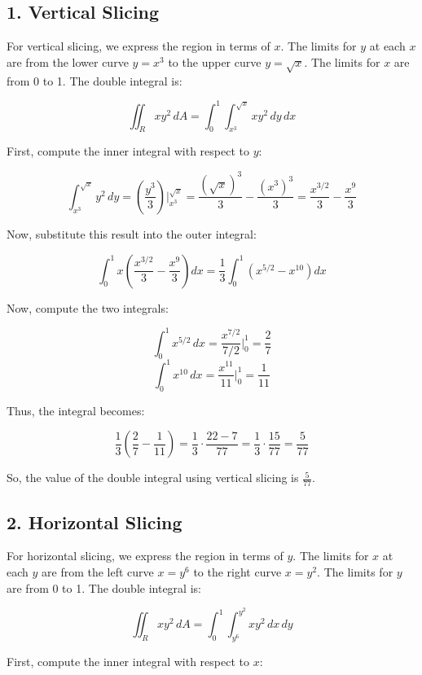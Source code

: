 \documentclass[11pt]{article}
\begin{document}
\newpage

\subsection{1. Vertical Slicing}

For vertical slicing, we express the region in terms of \( x \). The limits for \( y \) at each \( x \) are from the lower curve \( y = x^3 \) to the upper curve \( y = \sqrt{x} \). The limits for \( x \) are from 0 to 1. The double integral is:

\[
\iint_R x y^2 \, dA = \int_0^1 \int_{x^3}^{\sqrt{x}} x y^2 \, dy \, dx
\]

First, compute the inner integral with respect to \( y \):

\[
\int_{x^3}^{\sqrt{x}} y^2 \, dy = \left( \frac{y^3}{3} \right) \bigg|_{x^3}^{\sqrt{x}} = \frac{(\sqrt{x})^3}{3} - \frac{(x^3)^3}{3} = \frac{x^{3/2}}{3} - \frac{x^9}{3}
\]

Now, substitute this result into the outer integral:

\[
\int_0^1 x \left( \frac{x^{3/2}}{3} - \frac{x^9}{3} \right) dx = \frac{1}{3} \int_0^1 \left( x^{5/2} - x^{10} \right) dx
\]

Now, compute the two integrals:

\[
\int_0^1 x^{5/2} \, dx = \frac{x^{7/2}}{7/2} \bigg|_0^1 = \frac{2}{7}
\]
\[
\int_0^1 x^{10} \, dx = \frac{x^{11}}{11} \bigg|_0^1 = \frac{1}{11}
\]

Thus, the integral becomes:

\[
\frac{1}{3} \left( \frac{2}{7} - \frac{1}{11} \right) = \frac{1}{3} \cdot \frac{22 - 7}{77} = \frac{1}{3} \cdot \frac{15}{77} = \frac{5}{77}
\]

So, the value of the double integral using vertical slicing is \( \frac{5}{77} \).

\newpage

\subsection{2. Horizontal Slicing}

For horizontal slicing, we express the region in terms of \( y \). The limits for \( x \) at each \( y \) are from the left curve \( x = y^6 \) to the right curve \( x = y^2 \). The limits for \( y \) are from 0 to 1. The double integral is:

\[
\iint_R x y^2 \, dA = \int_0^1 \int_{y^6}^{y^2} x y^2 \, dx \, dy
\]

First, compute the inner integral with respect to \( x \):
\end{document}

